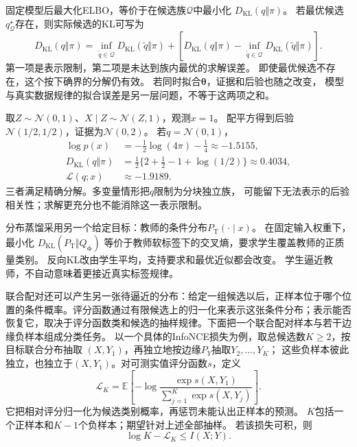 固定模型后最大化ELBO，等价于在候选族\(\mathcal Q\)中最小化
\(D_{\mathrm{KL}}(q\Vert\pi)\)。
若最优候选\(q^\star_{\mathcal Q}\)存在，则实际候选的KL可写为
\[
  D_{\mathrm{KL}}(q\Vert\pi)
  =\inf_{\widetilde q\in\mathcal Q}D_{\mathrm{KL}}(\widetilde q\Vert\pi)
   +\left[D_{\mathrm{KL}}(q\Vert\pi)
    -\inf_{\widetilde q\in\mathcal Q}D_{\mathrm{KL}}(\widetilde q\Vert\pi)\right].
\]
第一项是表示限制，第二项是未达到族内最优的求解误差。
即使最优候选不存在，这个按下确界的分解仍有效。
若同时拟合\(\bm\theta\)，证据和后验也随之改变，
模型与真实数据规律的拟合误差是另一层问题，不等于这两项之和。

取\(Z\sim\mathcal N(0,1)\)、\(X\mid Z\sim\mathcal N(Z,1)\)，观测\(x=1\)。
配平方得到后验\(\mathcal N(1/2,1/2)\)，证据为\(\mathcal N(0,2)\)。
若\(q=\mathcal N(0,1)\)，
\[
\begin{aligned}
  \log p(x)&=-\tfrac12\log(4\pi)-\tfrac14\approx-1.5155,\\
  D_{\mathrm{KL}}(q\Vert\pi)
  &=\tfrac12\{2+\tfrac12-1+\log(1/2)\}\approx0.4034,\\
  \mathcal L(q;x)&\approx-1.9189.
\end{aligned}
\]
三者满足精确分解。多变量情形把\(q\)限制为分块独立族，
可能留下无法表示的后验相关性；求解更充分也不能消除这一表示限制。

分布蒸馏采用另一个给定目标：教师的条件分布\(P_{\mathrm T}(\cdot\mid x)\)。
在固定输入权重下，最小化
\(D_{\mathrm{KL}}(P_{\mathrm T}\Vert Q_{\bm\phi})\)
等价于教师软标签下的交叉熵，要求学生覆盖教师的正质量类别。
反向KL改由学生平均，支持要求和最优近似都会改变。
学生逼近教师，不自动意味着更接近真实标签规律。

联合配对还可以产生另一张待逼近的分布：给定一组候选以后，正样本位于哪个位置的条件概率。评分函数通过有限候选上的归一化来表示这张条件分布；表示能否恢复它，取决于评分函数类和候选的抽样规律。下面把一个联合配对样本与若干边缘负样本组成分类任务。
以一个具体的InfoNCE损失为例，取总候选数\(K\geq2\)，按目标联合分布抽取
\((X,Y_1)\)，再独立地按边缘\(P_Y\)抽取\(Y_2,\ldots,Y_K\)；
这些负样本彼此独立，也独立于\((X,Y_1)\)。对可测实值评分函数\(s\)，定义
\begin{equation}
 \mathcal L_K
 =\mathbb E\left[-\log
   \frac{\exp s(X,Y_1)}{\sum_{j=1}^K\exp s(X,Y_j)}\right].
 \label{eq:information-contrastive-loss}
\end{equation}
它把相对评分归一化为候选类别概率，再惩罚未能认出正样本的预测。
\(K\)包括一个正样本和\(K-1\)个负样本；期望针对上述全部抽样。
若该损失可积，则
\[
 \log K-\mathcal L_K\leq I(X;Y).
\]

